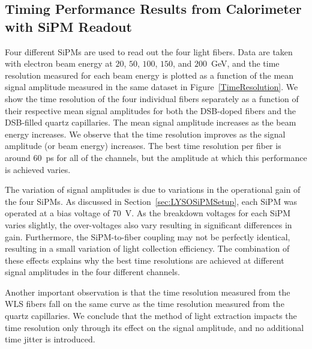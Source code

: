 \subsection{Timing Performance Results from Calorimeter with SiPM Readout}
\label{sec:beamtiming}

Four different SiPMs are used to read out the four light fibers. Data are taken with electron
beam energy at $20$, $50$, $100$, $150$, and $200$~GeV, and the time resolution
measured for each beam energy is plotted as a function of the mean signal
amplitude measured in the same dataset in Figure~\ref{TimeResolution}. We show
the time resolution of the four individual fibers separately as a function of their
respective mean signal amplitudes for both the DSB-doped fibers and the DSB-filled
quartz capillaries. The mean signal amplitude increases as the beam energy 
increases. We observe that the time resolution improves as the 
signal amplitude (or beam energy) increases. The best time resolution per fiber is around
$60$~ps for all of the channels, but the amplitude at which this performance is
achieved varies. 

The variation of signal amplitudes is due to variations in the operational gain
of the four SiPMs. As discussed in Section~\ref{sec:LYSOSiPMSetup}, each SiPM
was operated at a bias voltage of $70$~V. As the breakdown voltages for each
SiPM varies slightly, the over-voltages also vary resulting in significant
differences in gain. Furthermore, the SiPM-to-fiber coupling may not be perfectly
identical, resulting in a small variation of light collection efficiency. The combination of these effects
explains why the best time resolutions are achieved at different signal amplitudes in the four
different channels.

Another important observation is that the time resolution
measured from the WLS fibers fall on the same curve as the time
resolution measured from the quartz capillaries. We conclude that the method of
light extraction impacts the time resolution only through its effect on the
signal amplitude, and no additional time jitter is introduced. 


